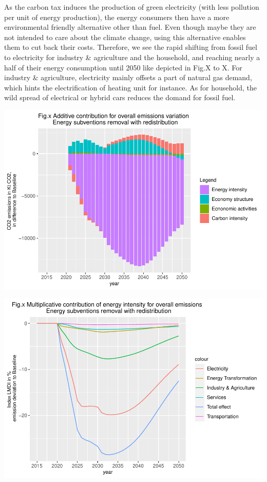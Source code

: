 \documentclass[
]{article}
\begin{document}
As the carbon tax induces the production of green electricity (with less
pollution per unit of energy production), the energy consumers then have
a more environmental friendly alternative other than fuel. Even though
maybe they are not intended to care about the climate change, using this
alternative enables them to cut back their costs. Therefore, we see the
rapid shifting from fossil fuel to electricity for industry \&
agriculture and the household, and reaching nearly a half of their
energy consumption until 2050 like depicted in Fig.X to X. For industry
\& agriculture, electricity mainly offsets a part of natural gas demand,
which hints the electrification of heating unit for instance. As for
household, the wild spread of electrical or hybrid cars reduces the
domand for fossil fuel.

\begin{center}\includegraphics[width=0.7\linewidth,height=0.7\textheight]{Modele-ThreeMe-Tunisie_Sequeira_Valilou_Wang_files/figure-latex/unnamed-chunk-28-1} \end{center}

\begin{center}\includegraphics[width=0.7\linewidth,height=0.7\textheight]{Modele-ThreeMe-Tunisie_Sequeira_Valilou_Wang_files/figure-latex/unnamed-chunk-29-1} \end{center}
\end{document}
